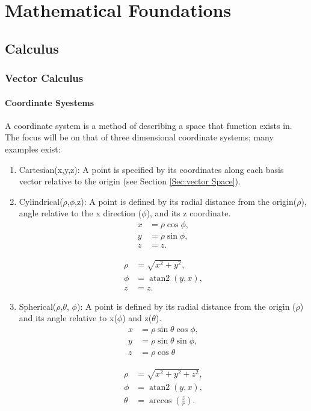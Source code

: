 \chapter{Mathematical Foundations}


\section{Calculus}
\subsection{Vector Calculus}
\subsubsection{Coordinate Syestems}
    A coordinate system is a method of describing a space that function exists in. The focus will be on that of three dimensional coordinate systems; many examples exist: 
    \begin{enumerate}
        \item Cartesian(x,y,z): A point is specified by its coordinates along each basis vector relative to the origin (see Section \ref{Sec:vector Space}).
        \item Cylindrical($\rho$,$\phi$,z): A point is defined by its radial distance from the origin($\rho$), angle relative to the x direction ($\phi$), and its z coordinate.
        \begin{align}
            x &= \rho \cos\phi, \\
            y &= \rho \sin\phi, \\
            z &= z.
        \end{align}

        \begin{align}
            \rho &= \sqrt{x^2+y^2}, \\
            \phi &= \operatorname{atan2}(y,x), \\
            z &= z.
        \end{align}
        \item Spherical($\rho$,$\theta$, $\phi$): A point is defined by its radial distance from the origin ($\rho$) and its angle relative to x($\phi$) and z($\theta$). 
            \begin{align}
                x &= \rho \sin\theta \cos\phi, \\
                y &= \rho \sin\theta \sin\phi, \\
                z &= \rho \cos\theta
            \end{align}

            \begin{align}
                \rho &= \sqrt{x^2+y^2+z^2}, \\
                \phi &= \operatorname{atan2}(y,x), \\
                \theta &= \arccos\!\left(\frac{z}{r}\right).
            \end{align}
    \end{enumerate}

